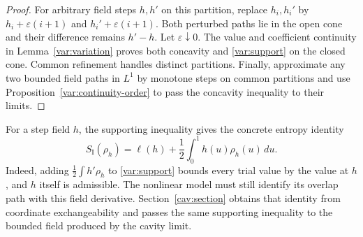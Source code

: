 \begin{proof}
For arbitrary field steps $h,h'$ on this partition, replace
$h_i,h_i'$ by $h_i+\varepsilon(i+1)$ and
$h_i'+\varepsilon(i+1)$. Both perturbed paths lie in the open
cone and their difference remains $h'-h$. Let
$\varepsilon\downarrow0$. The value and coefficient continuity
in Lemma~\ref{var:variation} proves both concavity and
\eqref{var:support} on the closed cone. Common refinement
handles distinct partitions. Finally, approximate any two
bounded field paths in $L^1$ by monotone steps on common
partitions and use Proposition~\ref{var:continuity-order} to
pass the concavity inequality to their limits.
\end{proof}

For a step field $h$, the supporting inequality gives the concrete
entropy identity
\[
 S_{\mathrm I}(\rho_h)
 =\ell(h)+\frac12\int_0^1h(u)\rho_h(u)\,du.
\]
Indeed, adding $\frac12\int h'\rho_h$ to \eqref{var:support}
bounds every trial value by the value at $h$, and $h$ itself is
admissible. The nonlinear model must still identify its overlap path
with this field derivative. Section~\ref{cav:section} obtains that
identity from coordinate exchangeability and passes the same supporting
inequality to the bounded field produced by the cavity limit.
